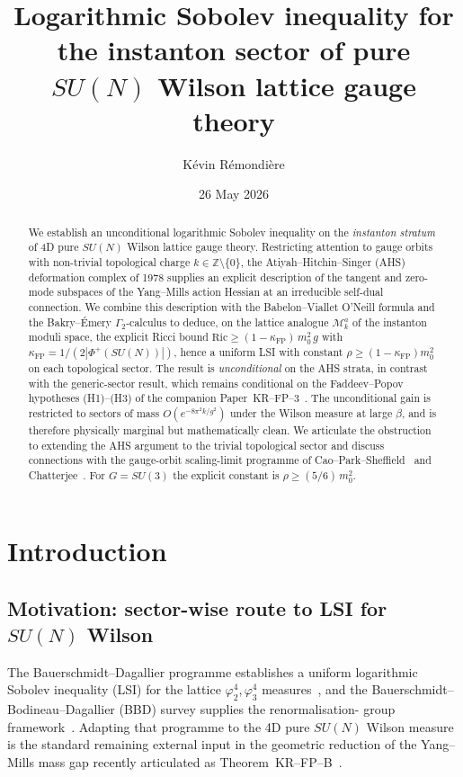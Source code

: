 \documentclass[11pt,a4paper]{amsart}
\title[LSI for the instanton sector of $SU(N)$ Wilson]
{Logarithmic Sobolev inequality for the instanton sector
 of pure $SU(N)$ Wilson lattice gauge theory}
\author{K\'evin R\'emondi\`ere}
\date{26 May 2026}
\theoremstyle{definition}
\newcommand{\Z}{\mathbb{Z}}
\newcommand{\Ric}{\mathrm{Ric}}
\newcommand{\Mmod}{\mathcal{M}}
\newcommand{\kFP}{\kappa_{\mathrm{FP}}}
\begin{document}
\begin{abstract}
We establish an unconditional logarithmic Sobolev inequality on the
\emph{instanton stratum} of 4D pure $SU(N)$ Wilson lattice gauge theory.
Restricting attention to gauge orbits with non-trivial topological charge
$k\in\Z\setminus\{0\}$, the Atiyah--Hitchin--Singer (AHS) deformation
complex of 1978 supplies an explicit description of the tangent and
zero-mode subspaces of the Yang--Mills action Hessian at an irreducible
self-dual connection. We combine this description with the
Babelon--Viallet O'Neill formula and the Bakry--\'Emery
$\Gamma_2$-calculus to deduce, on the lattice analogue $\Mmod_k^a$ of the
instanton moduli space, the explicit Ricci bound
$\Ric\geq(1-\kFP)\,m_0^2\,g$ with
$\kFP=1/(2|\Phi^+(SU(N))|)$, hence a uniform LSI
with constant $\rho\geq(1-\kFP)m_0^2$ on each topological sector. The
result is \emph{unconditional} on the AHS strata, in contrast with the
generic-sector result, which remains conditional on the
Faddeev--Popov hypotheses (H1)--(H3) of the companion
Paper~KR--FP--3~\cite{RemondiereKRFP3_2026}. The unconditional gain is
restricted to sectors of mass $O(e^{-8\pi^2 k/g^2})$ under the Wilson
measure at large $\beta$, and is therefore physically marginal but
mathematically clean. We articulate the obstruction to extending the AHS
argument to the trivial topological sector and discuss connections with
the gauge-orbit scaling-limit programme of
Cao--Park--Sheffield~\cite{CaoParkSheffield2024} and
Chatterjee~\cite{Chatterjee2024}.
For $G=SU(3)$ the explicit constant is $\rho\geq(5/6)\,m_0^2$.
\end{abstract}

\maketitle

\section{Introduction}\label{sec:intro}

\subsection{Motivation: sector-wise route to LSI for $SU(N)$ Wilson}
The Bauerschmidt--Dagallier programme establishes a uniform logarithmic
Sobolev inequality (LSI) for the lattice $\varphi^4_2,\varphi^4_3$
measures~\cite{BauerschmidtDagallier2024}, and the
Bauerschmidt--Bodineau--Dagallier (BBD) survey supplies the renormalisation-
group framework~\cite{BauerschmidtBodineauDagallier2024}. Adapting that
programme to the 4D pure $SU(N)$ Wilson measure is the standard remaining
external input in the geometric reduction of the Yang--Mills mass gap
recently articulated as Theorem~KR--FP--B~\cite{RemondiereKRFPB_2026,
RemondiereKRFP3_2026}.
\end{document}
